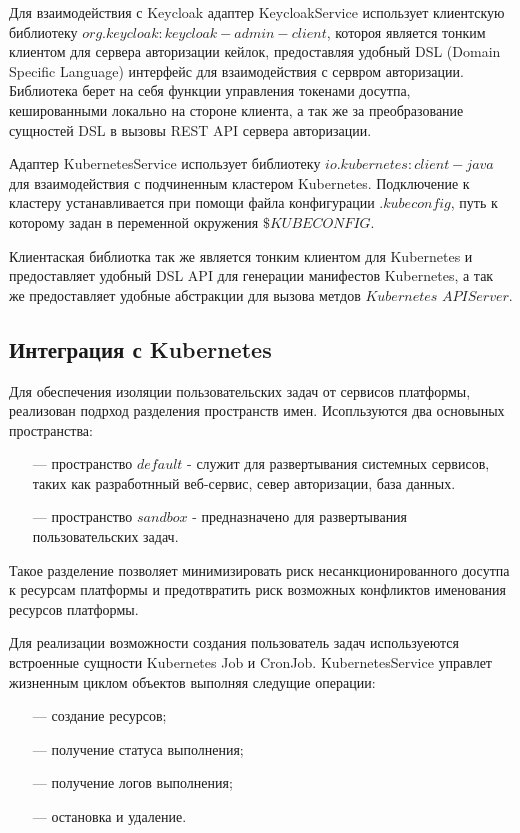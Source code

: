 Для взаимодействия с Keycloak адаптер KeycloakService использует клиентскую библиотеку $org.keycloak:keycloak-admin-client$, котороя является тонким клиентом для сервера авторизации кейлок, предоставляя удобный DSL (Domain Specific Language)\cite{mernik2005and} интерфейс для взаимодействия с сервром авторизации. Библиотека берет на себя функции управления токенами досутпа, кешированными локально на стороне клиента, а так же за преобразование сущностей DSL в вызовы REST API сервера авторизации.

Адаптер KubernetesService использует библиотеку $io.kubernetes:client-java$ для взаимодействия с подчиненным кластером Kubernetes. Подключение к кластеру устанавливается при помощи файла конфигурации $.kubeconfig$, путь к которому задан в переменной окружения $\$KUBECONFIG$.

Клиентаская библиотка так же является тонким клиентом для Kubernetes и предоставляет удобный DSL API для генерации манифестов Kubernetes\cite{poulton2023kubernetes}, а так же предоставляет удобные абстракции для вызова метдов $Kubernetes$ $API Server$.

\subsection{Интеграция с Kubernetes}

Для обеспечения изоляции пользовательских задач от сервисов платформы, реализован подрход разделения пространств имен.
Исопльзуются два основыных пространства:

\begin{itemize}
\item[---] пространство $default$ - служит для развертывания системных сервисов, таких как разработнный веб-сервис, север авторизации, база данных.
\item[---] пространство $sandbox$ - предназначено для развертывания пользовательских задач. 
\end{itemize}

Такое разделение позволяет минимизировать риск несанкционированного досутпа к ресурсам платформы и предотвратить риск возможных конфликтов именования ресурсов платформы.

Для реализации возможности создания пользователь задач используеются встроенные сущности Kubernetes Job и CronJob.
KubernetesService управлет жизненным циклом объектов выполняя следущие операции:

\begin{itemize}
\item[---] создание ресурсов;
\item[---] получение статуса выполнения;
\item[---] получение логов выполнения;
\item[---] остановка и удаление.
\end{itemize}

